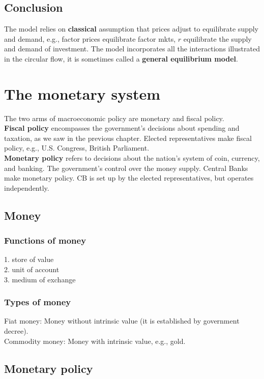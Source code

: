\documentclass[12pt]{article}
\begin{document}
\subsection{Conclusion}
The model relies on {\textbf {classical}} assumption that prices adjust to equilibrate
supply and demand, e.g., factor prices equilibrate factor mkts, $ r $ equilibrate the
supply and demand of investment.
The model incorporates all the interactions illustrated in the circular flow, it is
sometimes called a {\textbf {general equilibrium model}}.




\section{The monetary system}

The two arms of macroeconomic policy are monetary and fiscal policy.\\
{\textbf {Fiscal policy}} encompasses the government’s decisions about spending and 
taxation, as we saw in the previous chapter. Elected representatives make fiscal policy,
e.g., U.S. Congress, British Parliament.\\
{\textbf {Monetary policy}} refers to decisions about the nation’s system of coin,
currency, and banking. The government's control over the money supply. Central Banks 
make monetary policy. CB is set up by the elected representatives, but operates 
independently.


\subsection{Money}
\subsubsection{Functions of money}
1. store of value\\
2. unit of account\\
3. medium of exchange


\subsubsection{Types of money}
Fiat money: Money without intrinsic value (it is established by government decree).\\
Commodity money: Money with intrinsic value, e.g., gold.



\subsection{Monetary policy}
\end{document}
